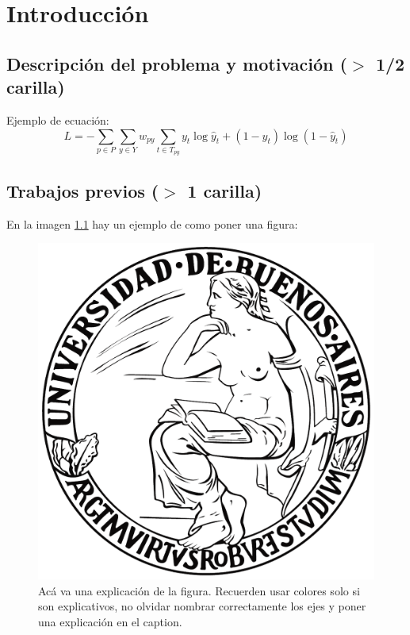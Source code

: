 \documentclass[11pt,a4paper,twoside]{tesis}
\begin{document}

\def\autor{Autor}
\def\tituloTesis{Título del Trabajo de Especialización}
\def\runtitulo{Resumen}
\def\runtitle{Título del Trabajo}
\def\lugar{Buenos Aires, 2022}


\frontmatter
\pagestyle{empty}





\tableofcontents

\mainmatter
\pagestyle{headings}


\chapter{Introducción}

\section{Descripción del problema y motivación ($>$ 1/2 carilla)}

Ejemplo de ecuación:
\begin{equation}
L = - \sum_{p \in P} \sum_{y \in Y} w_{py} \sum_{t \in T_{py}} y_t \log \hat y_t + (1-y_t) \log (1-\hat y_t)
\label{eq:loss}
\end{equation}

\section{Trabajos previos ($>$ 1 carilla)}
En la imagen \ref{fig:label} hay un ejemplo de como poner una figura:
\begin{figure}[h]
\centering
\includegraphics[width=0.5\columnwidth]{logouba.png}
\caption{Acá va una explicación de la figura. Recuerden usar colores solo si son explicativos, no olvidar nombrar correctamente los ejes y poner una explicación en el caption.}
\label{fig:label}
\end{figure}
\end{document}
